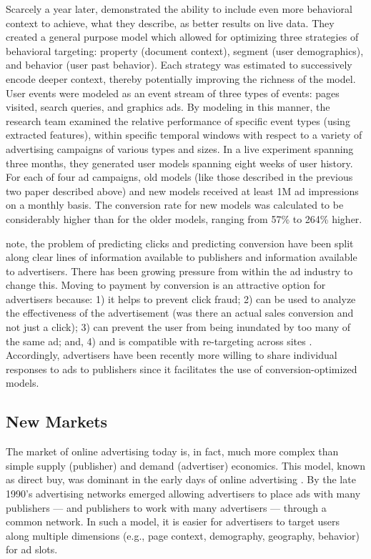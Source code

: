 Scarcely a year later,  \cite*{PandeyΟ:2011ug}  demonstrated the ability to include even more behavioral context to achieve, what they describe, as better results on live data. They created a general purpose model which allowed for optimizing three strategies of behavioral targeting: property (document context), segment (user demographics), and behavior (user past behavior). Each strategy was estimated to successively encode deeper context, thereby potentially improving the richness of the model. User events were modeled as an event stream of three types of events: pages visited, search queries, and graphics ads. By modeling in this manner, the research team examined the relative performance of specific event types (using extracted features), within specific temporal windows with respect to a variety of advertising campaigns of various types and sizes.
In a live experiment spanning three months, they generated user models spanning eight weeks of user history. For each of four ad campaigns, old models (like those described in the previous two paper described above) and new models received at least 1M ad impressions on a monthly basis. The conversion rate for new models was calculated to be considerably higher than for the older models, ranging from 57\% to 264\% higher.

 \cite{PandeyΟ:2011ug}  note, the problem of predicting clicks and predicting conversion have been split along clear lines of information available to publishers and information available to advertisers. There has been growing pressure from within the ad industry to change this. Moving to payment by conversion is an attractive option for advertisers because: 1) it helps to prevent click fraud; 2) can be used to analyze the effectiveness of the advertisement (was there an actual sales conversion and not just a click); 3) can prevent the user from being inundated by too many of the same ad; and, 4) and is compatible with re-targeting across sites  \citep{PandeyΟ:2011ug}.  Accordingly, advertisers have been recently more willing to share individual responses to ads to publishers since it facilitates the use of conversion-optimized models.

\subsection{New Markets}
\label{newmarkets}

The market of online advertising today is, in fact, much more complex than simple supply (publisher) and demand (advertiser) economics. This model, known as direct buy, was dominant in the early days of online advertising  \citep{Mayer:2012wt}.  By the late 1990's advertising networks emerged allowing advertisers to place ads with many publishers --- and publishers to work with many advertisers --- through a common network. In such a model, it is easier for advertisers to target users along multiple dimensions (e.g., page context, demography, geography, behavior) for ad slots.

